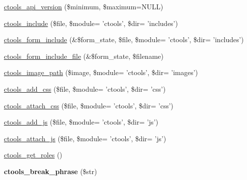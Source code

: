 \begin{DoxyCompactItemize}
\item 
\hyperlink{ctools_8module_a68cd3b30d58f60bb475e83662282536c}{ctools\_\-api\_\-version} (\$minimum, \$maximum=NULL)
\item 
\hyperlink{ctools_8module_aab220ed5e60234f37c77bedbdb8a4905}{ctools\_\-include} (\$file, \$module= 'ctools', \$dir= 'includes')
\item 
\hyperlink{ctools_8module_a79f73d0cd92770dbcf2c40699631cb8d}{ctools\_\-form\_\-include} (\&\$form\_\-state, \$file, \$module= 'ctools', \$dir= 'includes')
\item 
\hyperlink{ctools_8module_a8ad74264a9f461ec5748e498f1e8c0c1}{ctools\_\-form\_\-include\_\-file} (\&\$form\_\-state, \$filename)
\item 
\hyperlink{ctools_8module_a8c2a362e0904c9014ef0bb33961cbd09}{ctools\_\-image\_\-path} (\$image, \$module= 'ctools', \$dir= 'images')
\item 
\hyperlink{ctools_8module_a7b78eac67e8823a71bee58235355be22}{ctools\_\-add\_\-css} (\$file, \$module= 'ctools', \$dir= 'css')
\item 
\hyperlink{ctools_8module_ac92693fc61e852535e2ff6adecd1d44d}{ctools\_\-attach\_\-css} (\$file, \$module= 'ctools', \$dir= 'css')
\item 
\hyperlink{ctools_8module_abfc334b854ec27961cfb3f07382fb370}{ctools\_\-add\_\-js} (\$file, \$module= 'ctools', \$dir= 'js')
\item 
\hyperlink{ctools_8module_a54e5865cad2e61ea2c4d5acd4640e7fb}{ctools\_\-attach\_\-js} (\$file, \$module= 'ctools', \$dir= 'js')
\item 
\hyperlink{ctools_8module_a3d56126c4b5208ea2d39019aeef57217}{ctools\_\-get\_\-roles} ()
\item 
\hypertarget{ctools_8module_adab3343460aef11e78323a1bbcfd74e9}{
{\bfseries ctools\_\-break\_\-phrase} (\$str)}
\label{ctools_8module_adab3343460aef11e78323a1bbcfd74e9}


\end{DoxyCompactItemize}
